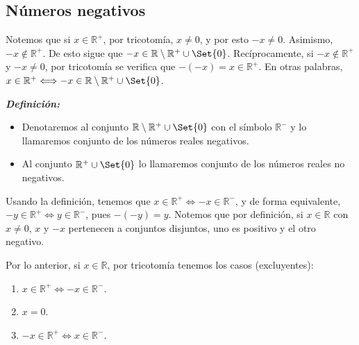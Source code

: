 \documentclass[11pt]{article}
\newcommand{\R}{\mathbb{R}}
\newcommand{\defined}{\coloneqq}
\newcommand{\bfit}[1]{\textbf{\textit{#1}}}
\let\set\Set
\let\union\cup
\begin{document}
\subsection*{Números negativos}

Notemos que si $x\in \R^+$, por tricotomía, $x\neq 0$, y por esto $-x\neq 0$. Asimismo, $-x\notin \R^+$. De esto sigue que $-x\in \R\setminus \R^+\union \set{0}$. Recíprocamente, si $-x\notin \R^+$ y $-x\neq 0$, por tricotomía se verifica que $-(-x)=x\in \R^+$. En otras palabras, $x\in \R^+ \Longleftrightarrow -x\in \R\setminus \R^+\union \set{0}$.

\bfit{Definición:}\begin{itemize}
    \item Denotaremos al conjunto $\R\setminus \R^+\union \set{0}$ con el símbolo $\R^-$ y lo llamaremos conjunto de los números reales negativos.
    \item Al conjunto $\R^+\union \set{0}$ lo llamaremos conjunto de los números reales no negativos.
\end{itemize}
Usando la definición, tenemos que $x\in \R^+ \Longleftrightarrow -x\in \R^-$, y de forma equivalente, $-y\in \R^+ \Longleftrightarrow y\in \R^-$, pues $-(-y)=y$. Notemos que por definición, si $x\in \R$ con $x\neq 0$, $x$ y $-x$ pertenecen a conjuntos disjuntos, uno es positivo y el otro negativo.%

Por lo anterior, si $x\in \R$, por tricotomía tenemos los casos (excluyentes): \vspace{-1em}\begin{enumerate}[label=\roman*)]
\item $x \in \R^+ \Longleftrightarrow -x\in \R^-$.
\item $x = 0$.
\item $-x \in \R^+ \Longleftrightarrow x\in \R^-$.
\end{enumerate}\vspace{-1em}
\end{document}
